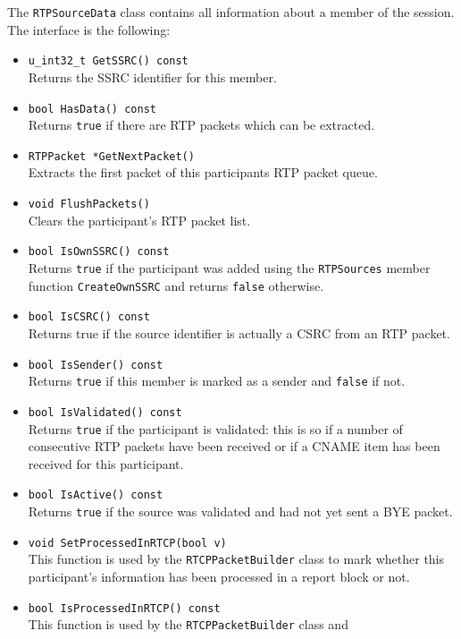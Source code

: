\documentclass[12pt,a4paper]{article}
\begin{document}
				The {\tt RTPSourceData} class contains all information about a member
				of the session. The interface is the following:
				\begin{itemize}
					\item {\tt u\_int32\_t GetSSRC() const}\\
						Returns the SSRC identifier for this member.
					\item {\tt bool HasData() const}\\
						Returns {\tt true} if there are RTP packets which can be extracted.
					\item {\tt RTPPacket *GetNextPacket()}\\
						Extracts the first packet of this participants RTP packet queue.
					\item {\tt void FlushPackets()}\\
						Clears the participant's RTP packet list.
					\item {\tt bool IsOwnSSRC() const}\\
						Returns {\tt true} if the participant was added using the
						{\tt RTPSources} member function {\tt CreateOwnSSRC} and
						returns {\tt false} otherwise.
					\item {\tt bool IsCSRC() const}\\
						Returns true if the source identifier is actually a CSRC from
						an RTP packet.
					\item {\tt bool IsSender() const}\\
						Returns {\tt true} if this member is marked as a sender and
						{\tt false} if not.
					\item {\tt bool IsValidated() const}\\
						Returns {\tt true} if the participant is validated: this is so
						if a number of consecutive RTP packets have been received or if
						a CNAME item has been received for this participant.
					\item {\tt bool IsActive() const}\\
						Returns {\tt true} if the source was validated and had not yet
						sent a BYE packet.
					\item {\tt void SetProcessedInRTCP(bool v)}\\
						This function is used by the {\tt RTCPPacketBuilder} class to mark
						whether this participant's information has been processed in a
						report block or not.
					\item {\tt bool IsProcessedInRTCP() const}\\
						This function is used by the {\tt RTCPPacketBuilder} class and

\end{itemize}
\end{document}
